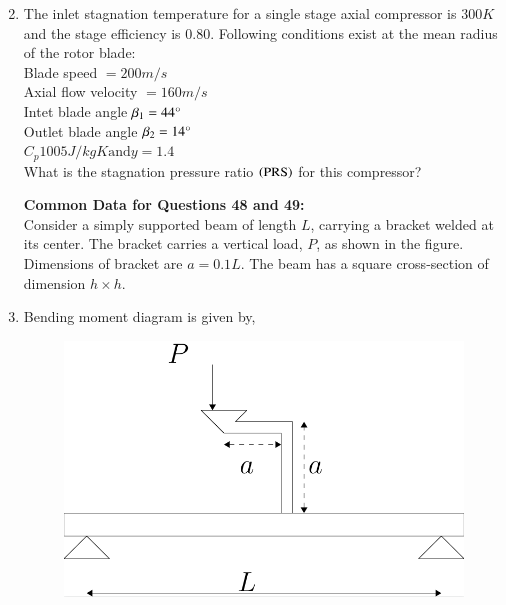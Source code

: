 \documentclass[journal]{IEEEtran}
\begin{document}
\begin{enumerate}
\begin{enumerate}
\begin{multicols}{2}
    \end{multicols}
\end{enumerate}
\item The inlet stagnation temperature for a single stage axial compressor is $300 K$ and the stage efficiency is $0.80$. Following conditions exist at the mean radius of the rotor blade: \\
	Blade speed $= 200 m/s$\\
	Axial flow velocity $=160 m/s$\\
	Intet blade angle $\beta_1 = 44\degree$\\
	Outlet blade angle $\beta_2 = 14\degree$\\
	$C_p 1005 J/kgK \text{and} y= 1.4$\\
	What is the stagnation pressure ratio $\left(\text{PRS}\right)$ for this compressor?

	\begin{enumerate}
\end{enumerate}
\textbf{Common Data for Questions 48 and 49:}\\
Consider a simply supported beam of length $L$, carrying a bracket welded at its center. The bracket carries a vertical load, $P$, as shown in the figure. Dimensions of bracket are $a=0.1L$. The beam has a square cross-section of dimension $h \times h$.
\item Bending moment diagram is given by,
\begin{figure}[H]
			\centering
			\includegraphics[scale=0.4]{figs/para.png}
			\label{stemplot}
		\end{figure}


\end{enumerate}
\end{document}
